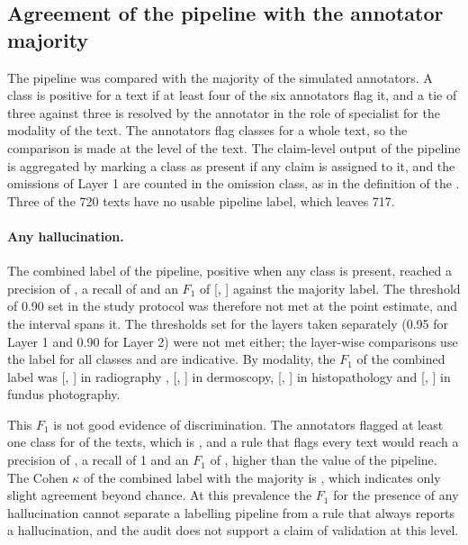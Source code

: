 \subsection{Agreement of the pipeline with the annotator majority}\label{sec:val_judge}
The pipeline was compared with the majority of the simulated annotators. A class is positive for a text if at least four of the six annotators flag it, and a tie of three against three is resolved by the annotator in the role of specialist for the modality of the text. The annotators flag classes for a whole text, so the comparison is made at the level of the text. The claim-level output of the pipeline is aggregated by marking a class as present if any claim is assigned to it, and the omissions of Layer 1 are counted in the omission class, as in the definition of the \SMHR{}. Three of the 720 texts have no usable pipeline label, which leaves 717.

\paragraph{Any hallucination.} The combined label of the pipeline, positive when any class is present, reached a precision of , a recall of  and an $F_1$ of  [, ] against the majority label. The threshold of 0.90 set in the study protocol was therefore not met at the point estimate, and the interval spans it. The thresholds set for the layers taken separately (0.95 for Layer 1 and 0.90 for Layer 2) were not met either; the layer-wise comparisons use the label for all classes and are indicative. By modality, the $F_1$ of the combined label was  [, ] in radiography ,  [, ] in dermoscopy,  [, ] in histopathology and  [, ] in fundus photography.

This $F_1$ is not good evidence of discrimination. The annotators flagged at least one class for  of the  texts, which is , and a rule that flags every text would reach a precision of , a recall of 1 and an $F_1$ of , higher than the value of the pipeline. The Cohen $\kappa$ of the combined label with the majority is , which indicates only slight agreement beyond chance. At this prevalence the $F_1$ for the presence of any hallucination cannot separate a labelling pipeline from a rule that always reports a hallucination, and the audit does not support a claim of validation at this level.

